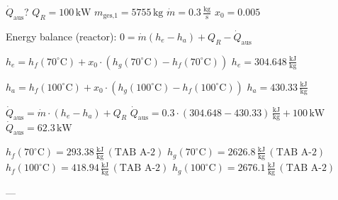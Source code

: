 \( \dot{Q}_{\text{aus}} \)?  
\( Q_R = 100 \, \text{kW} \)  
\( m_{\text{ges,1}} = 5755 \, \text{kg} \)  
\( \dot{m} = 0.3 \, \frac{\text{kg}}{\text{s}} \)  
\( x_0 = 0.005 \)  

Energy balance (reactor):  
\( 0 = \dot{m} (h_e - h_a) + Q_R - \dot{Q}_{\text{aus}} \)  

\( h_e = h_f(70^\circ \text{C}) + x_0 \cdot (h_g(70^\circ \text{C}) - h_f(70^\circ \text{C})) \)  
\( h_e = 304.648 \, \frac{\text{kJ}}{\text{kg}} \)  

\( h_a = h_f(100^\circ \text{C}) + x_0 \cdot (h_g(100^\circ \text{C}) - h_f(100^\circ \text{C})) \)  
\( h_a = 430.33 \, \frac{\text{kJ}}{\text{kg}} \)  

\( \dot{Q}_{\text{aus}} = \dot{m} \cdot (h_e - h_a) + Q_R \)  
\( \dot{Q}_{\text{aus}} = 0.3 \cdot (304.648 - 430.33) \, \frac{\text{kJ}}{\text{kg}} + 100 \, \text{kW} \)  
\( \dot{Q}_{\text{aus}} = 62.3 \, \text{kW} \)  

\( h_f(70^\circ \text{C}) = 293.38 \, \frac{\text{kJ}}{\text{kg}} \, (\text{TAB A-2}) \)  
\( h_g(70^\circ \text{C}) = 2626.8 \, \frac{\text{kJ}}{\text{kg}} \, (\text{TAB A-2}) \)  
\( h_f(100^\circ \text{C}) = 418.94 \, \frac{\text{kJ}}{\text{kg}} \, (\text{TAB A-2}) \)  
\( h_g(100^\circ \text{C}) = 2676.1 \, \frac{\text{kJ}}{\text{kg}} \, (\text{TAB A-2}) \)  

---